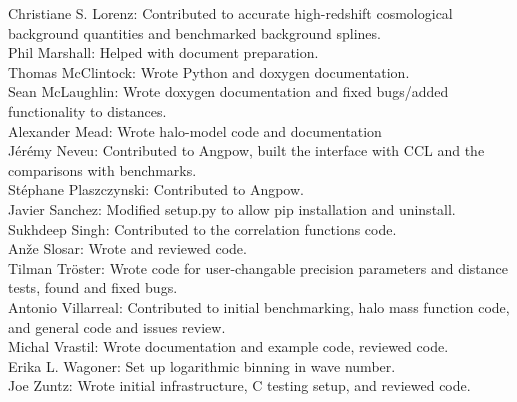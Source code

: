 Christiane S. Lorenz: Contributed to accurate high-redshift cosmological background quantities and benchmarked background splines. \\
Phil Marshall: Helped with document preparation. \\
Thomas McClintock: Wrote Python and doxygen documentation. \\
Sean McLaughlin: Wrote doxygen documentation and fixed bugs/added functionality to distances. \\
Alexander Mead: Wrote halo-model code and documentation \\
J\'er\'emy Neveu: Contributed to Angpow, built the interface with CCL and the comparisons with benchmarks. \\
St\'ephane Plaszczynski: Contributed to Angpow. \\
Javier Sanchez: Modified setup.py to allow pip installation and uninstall. \\
Sukhdeep Singh: Contributed to the correlation functions code. \\
An\v{z}e Slosar: Wrote and reviewed code. \\
Tilman Tr\"oster: Wrote code for user-changable precision parameters and distance tests, found and fixed bugs. \\
Antonio Villarreal: Contributed to initial benchmarking, halo mass function code, and general code and issues review. \\
Michal Vrastil: Wrote documentation and example code, reviewed code. \\
Erika L. Wagoner: Set up logarithmic binning in wave number. \\
Joe Zuntz: Wrote initial infrastructure, C testing setup, and reviewed code. \\
